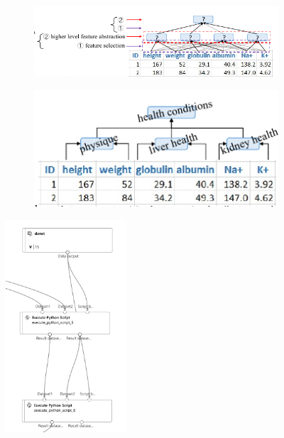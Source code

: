 \begin{figure}[H]
    \hfill
    \begin{subfigure}[m]{\textwidth}
        \centering
        \includegraphics[width=\textwidth]{images/danet_1}
    \end{subfigure}
    \hfill
    \begin{subfigure}[m]{\textwidth}
        \centering
        \includegraphics[width=\textwidth]{images/danet_2}
    \end{subfigure}
    \label{fig:danet-abst}
\end{figure}

\begin{figure}[H]
    \centering
    \includegraphics[width=0.4\textwidth]{images/danet}
    \label{fig:danet-pipe}
\end{figure}



